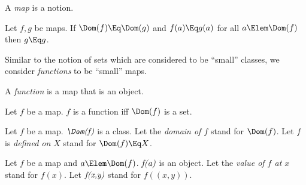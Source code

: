 \documentclass{stex}
\begin{document}
\begin{fakeforthel}
  \begin{signature*}
    A \emph{map} is a notion.
  \end{signature*}
\end{fakeforthel}

\begin{fakeforthel}
  \begin{axiom*}[title=Map Extensionality]
    Let $f,g$ be maps.
    If $\Dom(f) \Eq \Dom(g)$ and $f(a) \Eq g(a)$ for all $a \Elem \Dom(f)$ then $g \Eq g$.
  \end{axiom*}
\end{fakeforthel}

Similar to the notion of sets which are considered to be ``small'' classes, we
consider \emph{functions} to be ``small'' maps.

\begin{fakeforthel}
  \begin{definition*}
    A \emph{function} is a map that is an object.
  \end{definition*}
\end{fakeforthel}

\begin{forthel}
  \begin{axiom*}
    Let $f$ be a map.
    $f$ is a function iff $\Dom(f)$ is a set.
  \end{axiom*}
\end{forthel}

\begin{sparagraph}[style=symdoc,for=Dom]
  \begin{fakeforthel}
    \begin{signature*}
      Let $f$ be a map.
      $\emph{\Dom(f)}$ is a class.
      Let the \emph{domain of $f$} stand for $\Dom(f)$.
      Let $f$ is \emph{defined on $X$} stand for $\Dom(f) \Eq X$.
    \end{signature*}
  \end{fakeforthel}
\end{sparagraph}

\begin{fakeforthel}
  \begin{signature*}
    Let $f$ be a map and $a \Elem \Dom(f)$.
    $\emph{f(a)}$ is an object.
    Let the \emph{value of $f$ at $x$} stand for $f(x)$.
    Let $\emph{f(x,y)}$ stand for $f((x,y))$.
  \end{signature*}
\end{fakeforthel}
\end{document}
